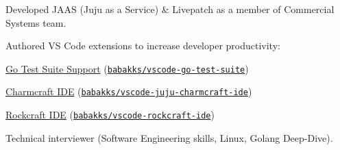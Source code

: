 \documentclass[9pt,a4paper]{extarticle}
\begin{document}


\begin{customitemize}
    \item {}
    \begin{customitemize}
        \item {}
        \begin{customitemize}
            \item[] {}
            \item{Developed JAAS (Juju as a Service) \& Livepatch as a member of Commercial Systems team.}
            \item{Authored VS Code extensions to increase developer productivity:}
            \begin{customitemize}
                \item{\href{https://marketplace.visualstudio.com/items?itemName=babakks.vscode-go-test-suite}{Go Test Suite Support} (\href{https://github.com/babakks/vscode-go-test-suite}{\texttt{babakks/vscode-go-test-suite}})}
                \item{\href{https://marketplace.visualstudio.com/items?itemName=babakks.vscode-juju-charmcraft-ide}{Charmcraft IDE} (\href{https://github.com/babakks/vscode-juju-charmcraft-ide}{\texttt{babakks/vscode-juju-charmcraft-ide}})}
                \item{\href{https://marketplace.visualstudio.com/items?itemName=babakks.vscode-rockcraft-ide}{Rockcraft IDE} (\href{https://github.com/babakks/vscode-rockcraft-ide}{\texttt{babakks/vscode-rockcraft-ide}})}
            \end{customitemize}
            \item{Technical interviewer (Software Engineering skills, Linux, Golang Deep-Dive).}
        \end{customitemize}
    \end{customitemize}


\end{customitemize}
\end{document}
